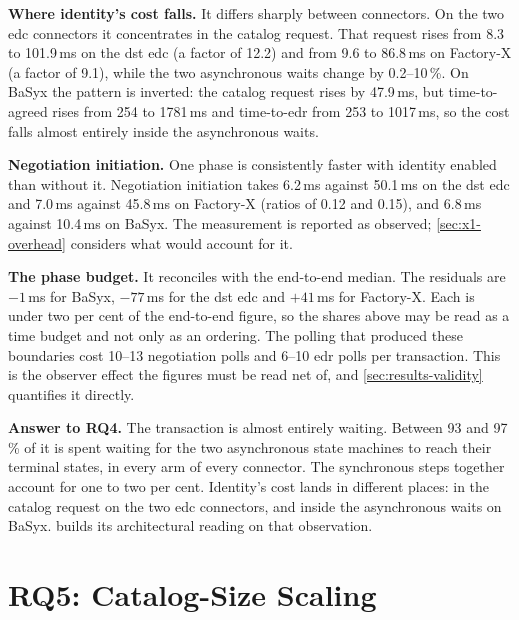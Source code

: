 \textbf{Where identity's cost falls.} It differs sharply between connectors. On the two \gls{edc} connectors it concentrates in the catalog request. That request rises from 8.3 to 101.9\,ms on the \gls{dst} \gls{edc} (a factor of 12.2) and from 9.6 to 86.8\,ms on Factory-X (a factor of 9.1), while the two asynchronous waits change by 0.2--10\,\%. On BaSyx the pattern is inverted: the catalog request rises by 47.9\,ms, but time-to-agreed rises from 254 to 1781\,ms and time-to-\gls{edr} from 253 to 1017\,ms, so the cost falls almost entirely inside the asynchronous waits.

\textbf{Negotiation initiation.} One phase is consistently faster with identity enabled than without it. Negotiation initiation takes 6.2\,ms against 50.1\,ms on the \gls{dst} \gls{edc} and 7.0\,ms against 45.8\,ms on Factory-X (ratios of 0.12 and 0.15), and 6.8\,ms against 10.4\,ms on BaSyx. The measurement is reported as observed; \cref{sec:x1-overhead} considers what would account for it.

\textbf{The phase budget.} It reconciles with the end-to-end median. The residuals are $-1$\,ms for BaSyx, $-77$\,ms for the \gls{dst} \gls{edc} and $+41$\,ms for Factory-X. Each is under two per cent of the end-to-end figure, so the shares above may be read as a time budget and not only as an ordering. The polling that produced these boundaries cost 10--13 negotiation polls and 6--10 \gls{edr} polls per transaction. This is the observer effect the figures must be read net of, and \cref{sec:results-validity} quantifies it directly.

\textbf{Answer to RQ4.} The transaction is almost entirely waiting. Between 93 and 97\,\% of it is spent waiting for the two asynchronous state machines to reach their terminal states, in every arm of every connector. The synchronous steps together account for one to two per cent. Identity's cost lands in different places: in the catalog request on the two \gls{edc} connectors, and inside the asynchronous waits on BaSyx.  builds its architectural reading on that observation.

\section{RQ5: Catalog-Size Scaling}\label{sec:rq5}


